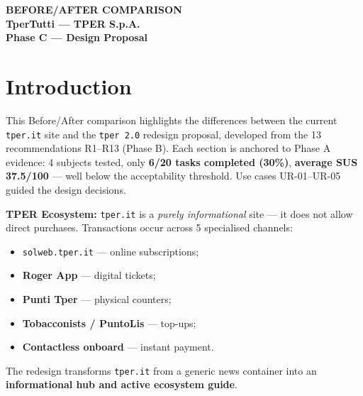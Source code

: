 ﻿
\begin{tcolorbox}[colback=primaryColor,colframe=primaryColor,arc=3mm,halign=center,valign=center,height=2.5cm]
    \color{white}\LARGE\bfseries BEFORE/AFTER COMPARISON \\[0.2cm]
    \color{white!80}\large TperTutti --- TPER S.p.A. \\[0.1cm]
    \color{white!60}\normalsize Phase C --- Design Proposal
\end{tcolorbox}

\vspace{0.5cm}

\section{Introduction}

This Before/After comparison highlights the differences between the current \texttt{tper.it} site and the \texttt{tper 2.0} redesign proposal, developed from the 13 recommendations R1--R13 (Phase B). Each section is anchored to Phase A evidence: 4 subjects tested, only \textbf{6/20 tasks completed (30\%)}, \textbf{average SUS 37.5/100} --- well below the acceptability threshold. Use cases UR-01--UR-05 guided the design decisions.

\vspace{0.2cm}

\textbf{TPER Ecosystem:} \texttt{tper.it} is a \textit{purely informational} site --- it does not allow direct purchases. Transactions occur across 5 specialised channels:
\begin{itemize}[nosep]
    \item \texttt{solweb.tper.it} --- online subscriptions;
    \item \textbf{Roger App} --- digital tickets;
    \item \textbf{Punti Tper} --- physical counters;
    \item \textbf{Tobacconists / PuntoLis} --- top-ups;
    \item \textbf{Contactless onboard} --- instant payment.
\end{itemize}
The redesign transforms \texttt{tper.it} from a generic news container into an \textbf{informational hub and active ecosystem guide}.

\vspace{0.3cm}

